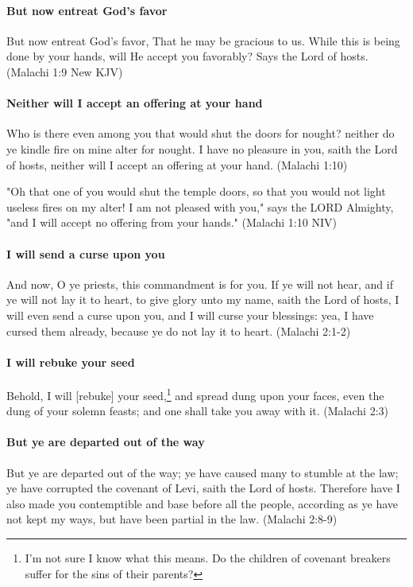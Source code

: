 \paragraph{But now entreat God's favor}
But now entreat God's favor, That he may be gracious to us. While this is being done by your hands, will He accept you favorably? Says the Lord of hosts. (Malachi 1:9 New KJV)

\paragraph{Neither will I accept an offering at your hand}
Who is there even among you that would shut the doors for nought? neither do ye kindle fire on mine alter for nought. I have no pleasure in you, saith the Lord of hosts, neither will I accept an offering at your hand. (Malachi 1:10)

"Oh that one of you would shut the temple doors, so that you would not light useless fires on my alter! I am not pleased with you," says the LORD Almighty, "and I will accept no offering from your hands." (Malachi 1:10 NIV)

\paragraph{I will send a curse upon you}
And now, O ye priests, this commandment is for you. If ye will not hear, and if ye will not lay it to heart, to give glory unto my name, saith the Lord of hosts, I will even send a curse upon you, and I will curse your blessings: yea, I have cursed them already, because ye do not lay it to heart. (Malachi 2:1-2)

\paragraph{I will rebuke your seed}
Behold, I will [rebuke] your seed,\footnote{I'm not sure I know what this means. Do the children of covenant breakers suffer for the sins of their parents?} and spread dung upon your faces, even the dung of your solemn feasts; and one shall take you away with it. (Malachi 2:3)

\paragraph{But ye are departed out of the way}
But ye are departed out of the way; ye have caused many to stumble at the law; ye have corrupted the covenant of Levi, saith the Lord of hosts. Therefore have I also made you contemptible and base before all the people, according as ye have not kept my ways, but have been partial in the law. (Malachi 2:8-9)

